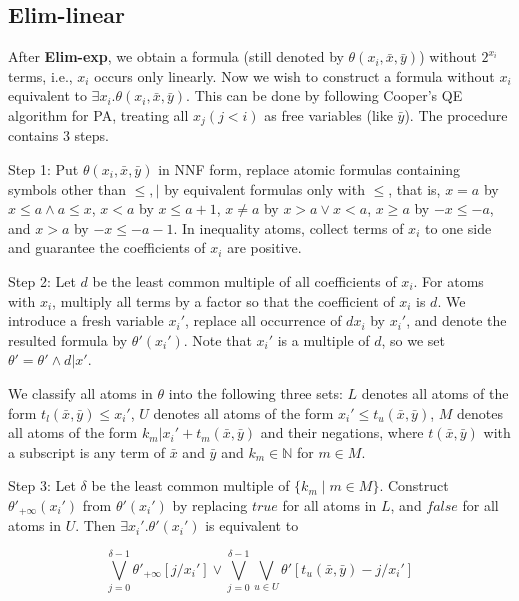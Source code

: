 
\subsection{Elim-linear}

After \textbf{Elim-exp}, 
we obtain a formula (still denoted by $\theta(x_i,\bar{x},\bar{y})$) without $2^{x_i}$ terms,
i.e., $x_i$ occurs only linearly.
Now we wish to construct a formula without $x_i$ equivalent to $\exists x_i.\theta(x_i,\bar{x},\bar{y})$.
This can be done by 
following Cooper's QE algorithm for PA,
treating all $x_j (j<i)$ as free variables (like $\bar{y}$).
The procedure contains 3 steps.

Step 1: Put $\theta(x_i,\bar{x},\bar{y})$ in NNF form, replace atomic formulas containing symbols other than $\le,|$ by equivalent formulas only with $\le$, that is, $x=a$ by $x\le a \wedge a\le x$, $x< a$ by $x\le a+1$, $x\neq a$ by $x>a \vee x<a$,  $x\geq a$ by $-x \le -a$, and $x>a$ by $-x \le -a-1$.
In inequality atoms, collect terms of $x_i$
to one side and guarantee the coefficients of $x_i$ are positive.

Step 2: Let $d$ be the least common multiple of all coefficients of $x_i$. 
For atoms with $x_i$, multiply all terms by a factor so that the coefficient of $x_i$ is $d$.
We introduce a fresh variable $x_i'$, replace all occurrence of $dx_i$ by $x_i'$,
and denote the resulted formula by $\theta'(x_i')$.
Note that $x_i'$ is a multiple of $d$, 
so we set $\theta'=\theta'\wedge d|x'$.

We classify all atoms in $\theta$ into the following three sets:  
$L$ denotes all atoms of the form $t_l(\bar{x},\bar{y})\le x_i'$,
$U$ denotes all atoms of the form $x_i'\le t_u(\bar{x},\bar{y})$,
$M$ denotes all atoms of the form $k_m|x_i'+t_m(\bar{x},\bar{y})$ and their negations,
where $t(\bar{x},\bar{y})$ with a subscript is any term of $\bar{x}$ and $\bar{y}$ and 
$k_m \in \mathbb{N}$ for $m\in M$. %

Step 3: Let $\delta$ be the least common multiple of $\{k_m \mid m\in M\}$.
Construct $\theta'_{+\infty}(x_i')$ from $\theta'(x_i')$ by  
 replacing $\textit{true}$ for all atoms in $L$,
and $\textit{false}$ for all atoms in  $U$.
Then $\exists x_i'.\theta'(x_i')$
is equivalent to

$$\bigvee_{j=0}^{\delta-1} \theta'_{+\infty}[j/x_i'] \vee 
\bigvee_{j=0}^{\delta-1} \bigvee_{u\in U} \theta'[t_u(\bar{x},\bar{y})-j/x_i']$$

